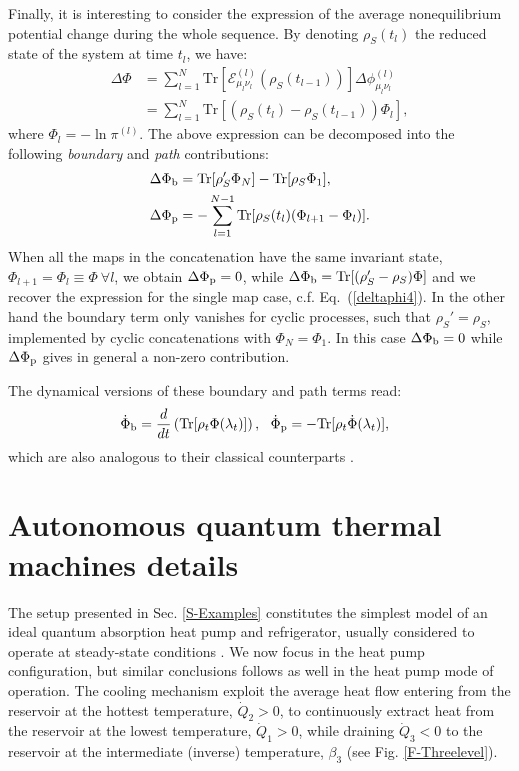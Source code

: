 \documentclass[aps,prx,twocolumn,showpacs,floatfix,superscriptaddress,graphics,longbibliography]{revtex4-1}
\newcommand{\tr}{\mathrm{Tr}}
\newcommand{\E}{{\mathcal E}}
\newcommand{\HAT}{}
\begin{document}
Finally, it is interesting to consider the expression of the average nonequilibrium potential change during the whole sequence. By denoting $\rho_S(t_l)$ the reduced state of the system at time $t_l$, we have:
\begin{align} \label{neqtp_c}
 \Delta \Phi &= \sum_{l=1}^N \tr[\E_{\mu_l \nu_l}^{(l)} (\rho_S(t_{l-1}))] \Delta \phi^{(l)}_{\mu_l \nu_l} \nonumber \\
 & = \sum_{l=1}^N \tr[(\rho_S(t_{l}) - \rho_S(t_{l-1})) \HAT{\Phi}_l],
\end{align}
where $\HAT{\Phi}_l = - \ln \pi^{(l)}$. 
The above expression can be decomposed into the following {\it boundary} and {\it path} contributions:
\begin{align}
 \Delta \Phi_{\rm b} &= {\rm Tr}[\rho_S' \HAT{\Phi}_N] - {\rm Tr}[\rho_S \HAT{\Phi}_1], \\ 
 \Delta \Phi_{\rm p} &= - \sum_{l=1}^{N-1} {\rm Tr}[\rho_S(t_l) (\HAT{\Phi}_{l+1} - \HAT{\Phi}_l)].
\end{align}
When all the maps in the concatenation have the same invariant state, $\HAT{\Phi}_{l+1} = \HAT{\Phi}_l \equiv \HAT{\Phi} ~ \forall l$, 
we obtain $\Delta \Phi_{\rm p} = 0$, while $\Delta \Phi_{\rm b} = {\rm Tr}[(\rho_S' - \rho_S) \HAT{\Phi}]$ and we recover the expression for the single map case, c.f. Eq.~(\ref{deltaphi4}). 
In the other hand the boundary term only vanishes for cyclic processes, such that $\rho_S' = \rho_S$, implemented by cyclic concatenations with $\HAT{\Phi}_N = \HAT{\Phi}_1$. 
In this case $\Delta \Phi_{\rm b} = 0$ while $\Delta \Phi_{\rm p}$ gives in general a non-zero contribution.

The dynamical versions of these boundary and path terms read:
\begin{eqnarray}
\dot{\Phi}_{\rm b} = \frac{d}{dt} \left( \tr[\rho_t \HAT{\Phi}(\lambda_t)] \right), ~~
\dot{\Phi}_{\rm p} = -\tr[\rho_t \dot{\HAT{\Phi}}(\lambda_t)], ~~
\end{eqnarray}
which are also analogous to their classical counterparts \cite{EspositoFaces, EspositoFacesI,EspositoFacesII}.


\section{Autonomous quantum thermal machines details} \label{appD}

The setup presented in Sec. \ref{S-Examples} constitutes the simplest model of an ideal quantum absorption heat pump and refrigerator, usually considered to operate at 
steady-state conditions \cite{CorreaSqz,Palao,Kosloff}. We now focus in the heat pump configuration, but similar conclusions follows as well in the heat pump mode of operation. 
The cooling mechanism exploit the average heat flow entering from the reservoir at the hottest temperature, $\dot{Q}_2 > 0$, to continuously extract heat from the reservoir at the 
lowest temperature, $\dot{Q}_1 > 0$, while draining $\dot{Q}_3 < 0$ to the reservoir at the intermediate (inverse) temperature, $\beta_3$ (see Fig. \ref{F-Threelevel}).
\end{document}
